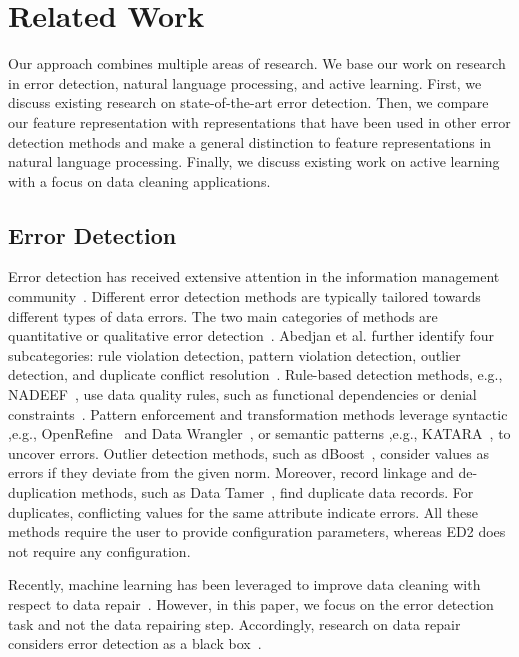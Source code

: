 \section{Related Work}
\label{sec:relatedwork}
Our approach combines multiple areas of research. We base our work on research in error detection, natural language processing, and active learning. First, we discuss existing research on state-of-the-art error detection. 
Then, we compare our feature representation with representations that have been used in other error detection methods and make a general distinction to feature representations in natural language processing.
Finally, we discuss existing work on active learning with a focus on data cleaning applications.

\subsection{Error Detection}

Error detection has received extensive attention in the information management community~\cite{abedjan2016detecting, chu2015katara, dallachiesa2013nadeef, pit2016outlier}. 
Different error detection methods are typically tailored towards different types of data errors. 
The two main categories of methods are quantitative or qualitative error detection~\cite{chu2016data}. 
Abedjan et al. further identify four subcategories: rule violation detection, pattern violation detection, outlier detection, and duplicate conflict resolution~\cite{abedjan2016detecting}. 
Rule-based detection methods, e.g., NADEEF~\cite{dallachiesa2013nadeef, khayyat2015bigdansing}, use data quality rules, such as functional dependencies or denial constraints~\cite{chu2013holistic}. 
Pattern enforcement and transformation methods leverage syntactic ,e.g., OpenRefine~\cite{verborgh2013using} and Data Wrangler~\cite{kandel2012enterprise}, or semantic patterns ,e.g., KATARA~\cite{chu2015katara}, to uncover errors. 
Outlier detection methods, such as dBoost~\cite{pit2016outlier}, consider values as errors if they deviate from the given norm.
Moreover, record linkage and de-duplication methods, such as Data Tamer~\cite{stonebraker2013data}, find duplicate data records. For duplicates, conflicting values for the same attribute indicate errors.
All these methods require the user to provide configuration parameters, whereas ED2 does not require any configuration.

Recently, machine learning has been leveraged to improve data cleaning with respect to data repair~\cite{yakout2011guided,rekatsinas2017holoclean,yakout2013don,volkovs2014continuous}. However, in this paper, we focus on the error detection task and not the data repairing step. Accordingly, research on data repair considers error detection as a black box~\cite{rekatsinas2017holoclean}.



